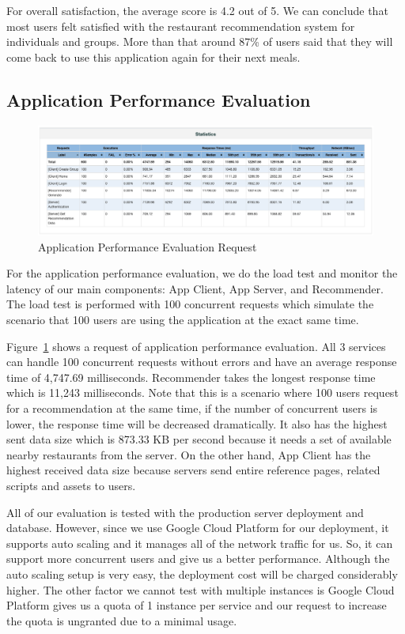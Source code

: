 \documentclass[12pt,oneside,openright,a4paper]{cpe-english-project}
\begin{document}
For overall satisfaction, the average score is 4.2 out of 5. We can conclude that most users felt satisfied with the restaurant recommendation system for individuals and groups. More than that around 87\% of users said that they will come back to use this application again for their next meals.

\subsection{Application Performance Evaluation}

\begin{figure}[H]\centering
\includegraphics[width=350pt]{./images/4ApplicationPerformanceEvaluationRequest.png}
\caption{Application Performance Evaluation Request}\label{fig:4ApplicationPerformanceEvaluationRequest}
\end{figure}\vspace{-24pt}

For the application performance evaluation, we do the load test and monitor the latency of our main components: App Client, App Server, and Recommender. The load test is performed with 100 concurrent requests which simulate the scenario that 100 users are using the application at the exact same time.

Figure~\ref{fig:4ApplicationPerformanceEvaluationRequest} shows a request of application performance evaluation. All 3 services can handle 100 concurrent requests without errors and have an average response time of 4,747.69 milliseconds. Recommender takes the longest response time which is 11,243 milliseconds. Note that this is a scenario where 100 users request for a recommendation at the same time, if the number of concurrent users is lower, the response time will be decreased dramatically. It also has the highest sent data size which is 873.33 KB per second because it needs a set of available nearby restaurants from the server. On the other hand, App Client has the highest received data size because servers send entire reference pages, related scripts and assets to users.

All of our evaluation is tested with the production server deployment and database. However, since we use Google Cloud Platform for our deployment, it supports auto scaling and it manages all of the network traffic for us. So, it can support more concurrent users and give us a better performance. Although the auto scaling setup is very easy, the deployment cost will be charged considerably higher. The other factor we cannot test with multiple instances is Google Cloud Platform gives us a quota of 1 instance per service and our request to increase the quota is ungranted due to a minimal usage.
\end{document}
